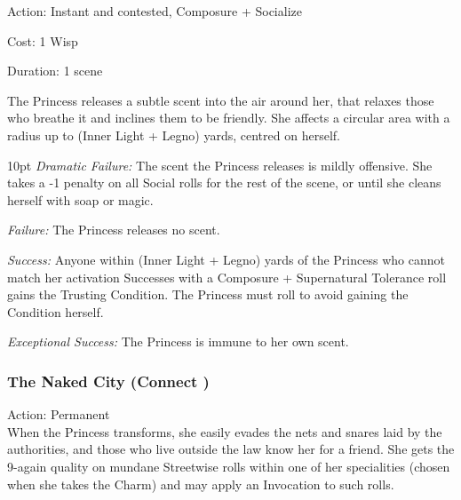 \noindent Action: Instant and contested, Composure + Socialize

\noindent Cost: 1 Wisp

\noindent Duration: 1 scene

The Princess releases a subtle scent into the air around her, that relaxes those who breathe it and inclines them to be friendly. She affects a circular area with a radius up to (Inner Light + Legno) yards, centred on
herself.

\begin{myindentpar}{10pt}    \emph{Dramatic Failure:} The scent the Princess releases is mildly offensive. She takes a -1 penalty on all Social rolls for the rest of the scene, or until she cleans herself with soap or magic.

    \emph{Failure:} The Princess releases no scent. 

    \emph{Success:} Anyone within (Inner Light + Legno) yards of the Princess who cannot match her activation Successes with a  Composure + Supernatural Tolerance roll gains the Trusting Condition. The Princess must roll to avoid gaining the Condition herself.

    \emph{Exceptional Success:} The Princess is immune to her own scent.\end{myindentpar}

\subsubsection*{The Naked City (Connect \textbullet)}

\noindent Action: Permanent \\

\noindent When the Princess transforms, she easily evades the nets and snares laid by the authorities, and those who live outside the law know her for a friend. She gets the 9-again quality on mundane Streetwise rolls within one of her specialities (chosen when she takes the Charm) and may apply an Invocation to such rolls.

